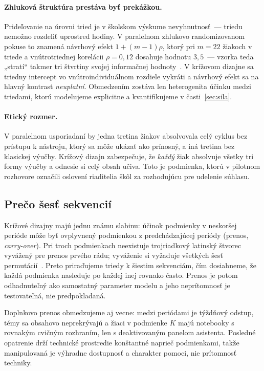 \paragraph{Zhluková štruktúra prestáva byť prekážkou.} Prideľovanie na úrovni tried je v školskom výskume nevyhnutnosť~--- triedu nemožno rozdeliť uprostred hodiny. V paralelnom zhlukovo randomizovanom pokuse to znamená návrhový efekt $1+(m-1)\rho$, ktorý pri $m=22$ žiakoch v triede a vnútrotriednej korelácii $\rho=0{,}12$ dosahuje hodnotu $3{,}5$~--- vzorka teda „stratí“ takmer tri štvrtiny svojej informačnej hodnoty~\cite{hedges2007icc,raudenbush1997cluster}. V krížovom dizajne sa triedny intercept vo vnútroindividuálnom rozdiele vykráti a návrhový efekt sa na hlavný kontrast \emph{neuplatní}. Obmedzením zostáva len heterogenita účinku medzi triedami, ktorú modelujeme explicitne a kvantifikujeme v časti~\ref{sec:sila}.

\paragraph{Etický rozmer.} V paralelnom usporiadaní by jedna tretina žiakov absolvovala celý cyklus bez prístupu k nástroju, ktorý sa môže ukázať ako prínosný, a iná tretina bez klasickej výučby. Krížový dizajn zabezpečuje, že \emph{každý} žiak absolvuje všetky tri formy výučby a odnesie si celý obsah učiva. Toto je podmienka, ktorú v pilotnom rozhovore označili oslovení riaditelia škôl za rozhodujúcu pre udelenie súhlasu.

\subsection{Prečo šesť sekvencií}

Krížové dizajny majú jednu známu slabinu: účinok podmienky v neskoršej perióde môže byť ovplyvnený podmienkou z predchádzajúcej periódy (prenos, \emph{carry-over}). Pri troch podmienkach neexistuje trojriadkový latinský štvorec vyvážený pre prenos prvého rádu; vyváženie si vyžaduje všetkých šesť permutácií~\cite{williams1949designs}. Preto priraďujeme triedy k šiestim sekvenciám, čím dosiahneme, že každá podmienka nasleduje po každej inej rovnako často. Prenos je potom odhadnuteľný ako samostatný parameter modelu a jeho neprítomnosť je testovateľná, nie predpokladaná.

Doplnkovo prenos obmedzujeme aj vecne: medzi periódami je týždňový odstup, témy sa obsahovo neprekrývajú a žiaci v podmienke $K$ majú notebooky s rovnakým cvičným rozhraním, len s deaktivovaným panelom asistenta. Posledné opatrenie drží technické prostredie konštantné naprieč podmienkami, takže manipulovaná je výhradne dostupnosť a charakter pomoci, nie prítomnosť techniky.

